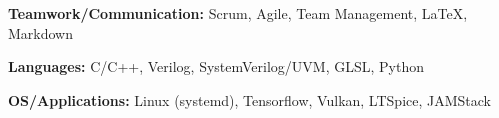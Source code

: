 \documentclass[9pt]{developercv}
\begin{document}
\begin{minipage}[t]{0.475\textwidth}
\end{minipage}
\hfill 
\begin{minipage}[t]{0.475\textwidth} 
	\vspace{-\baselineskip}


	\textbf{Teamwork/Communication:} Scrum, Agile, Team Management, LaTeX, Markdown

	\textbf{Languages:} C/C++, Verilog, SystemVerilog/UVM, GLSL, Python

	\textbf{OS/Applications:} Linux (systemd), Tensorflow, Vulkan, LTSpice, JAMStack


	

\end{minipage}
\end{document}
